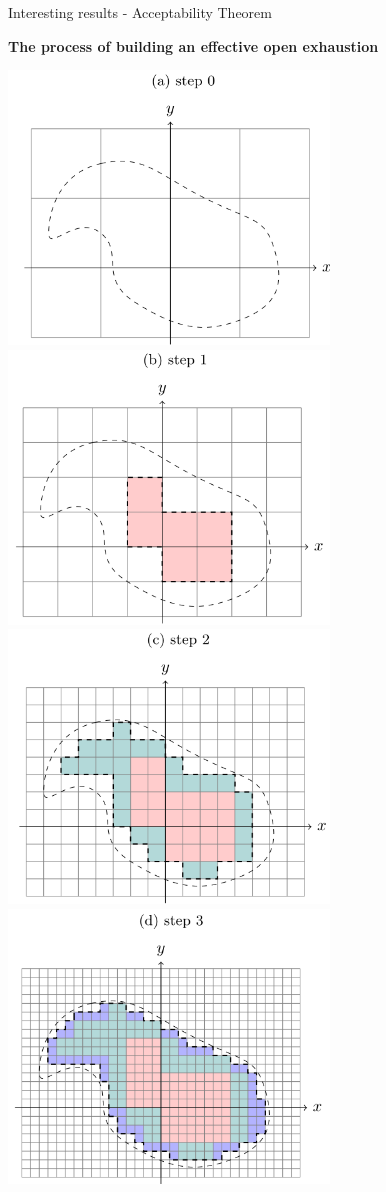 \begin{frame}{Interesting results - Acceptability Theorem }
\begin{minipage}[t]{0.45\linewidth}
    \end{minipage}
    \begin{minipage}[t]{0.54\linewidth}
        \center
        \pause
        \vspace{-1em}
        \color{MidnightBlue}
        \textbf{The process of building an effective open exhaustion}
        \vspace{-1em}
        \begin{flushright}
            \pause
            \includegraphics[width=0.48\linewidth]{tikz/step0.png}
            \pause
            \includegraphics[width=0.48\linewidth]{tikz/step1.png}
            \pause
            \includegraphics[width=0.48\linewidth]{tikz/step2.png}
            \pause
            \includegraphics[width=0.48\linewidth]{tikz/step3.png}
        \end{flushright}
    \end{minipage}
\end{frame}